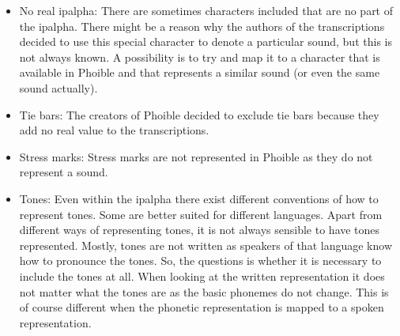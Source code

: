\begin{itemize}
\item No real \ac{ipalpha}: There are sometimes characters included that are no part of the \ac{ipalpha}. There might be a reason why the authors of the transcriptions decided to use this special character to denote a particular sound, but this is not always known. A possibility is to try and map it to a character that is available in Phoible and that represents a similar sound (or even the same sound actually). 
\item Tie bars: The creators of Phoible decided to exclude tie bars because they add no real value to the transcriptions. 
\item Stress marks: Stress marks are not represented in Phoible as they do not represent a sound. 
\item Tones: Even within the \ac{ipalpha} there exist different conventions of how to represent tones. Some are better suited for different languages. Apart from different ways of representing tones, it is not always sensible to have tones represented. Mostly, tones are not written as speakers of that language know how to pronounce the tones. So, the questions is whether it is necessary to include the tones at all. When looking at the written representation it does not matter what the tones are as the basic phonemes do not change. This is of course different when the phonetic representation is mapped to a spoken representation. 
\end{itemize}



